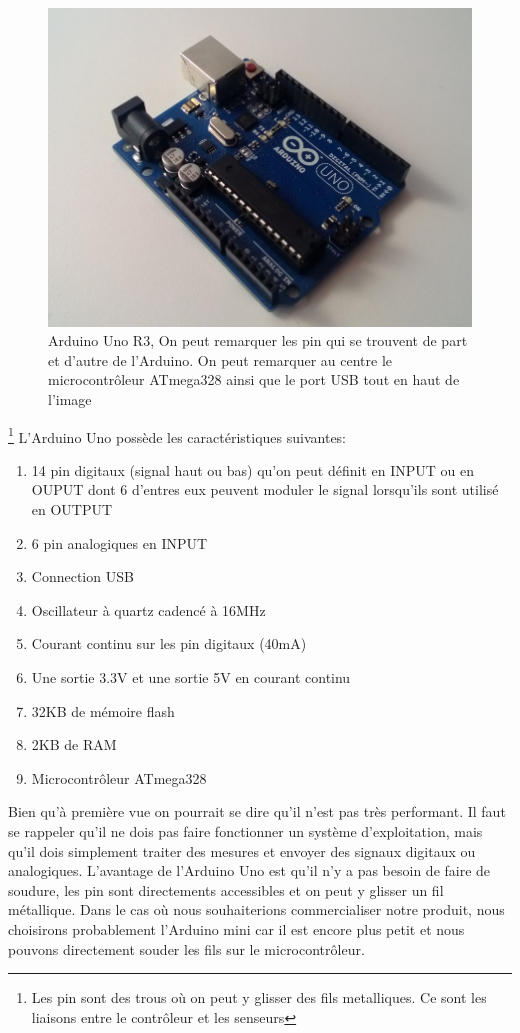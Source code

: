 \documentclass[a4paper,11pt]{report}
\begin{document}
{\begin{figure}[h]
\begin{center}
\includegraphics[scale=0.38]{arduino_uno.jpg}
\caption{Arduino Uno R3\label{fig:ArduinoUnoR3}, On peut remarquer les pin  \label{pin} qui se trouvent de part et d'autre de l'Arduino. On peut remarquer au centre le microcontrôleur ATmega328 ainsi que le port USB tout en haut de l'image}
\end{center}
\end{figure}\footnote{Les pin sont des trous où on peut y glisser des fils metalliques. Ce sont les liaisons entre le contrôleur et les senseurs}
L'Arduino Uno possède les caractéristiques suivantes:
\begin{enumerate}
\item 14 pin digitaux (signal haut ou bas) qu'on peut définit en INPUT ou en OUPUT dont 6 d'entres eux peuvent moduler le signal lorsqu'ils sont utilisé en OUTPUT
\item  6 pin analogiques  en INPUT
\item Connection USB
\item Oscillateur à quartz cadencé à 16MHz
\item Courant continu sur les pin digitaux (40mA)
\item Une sortie 3.3V et une sortie 5V en courant continu
\item 32KB de mémoire flash
\item 2KB de RAM
\item Microcontrôleur ATmega328
\end{enumerate}
Bien qu'à première vue on pourrait se dire qu'il n'est pas très performant. Il faut se rappeler qu'il ne dois pas faire fonctionner un système d'exploitation, mais qu'il dois simplement traiter des mesures et envoyer des signaux digitaux ou analogiques. L'avantage de l'Arduino Uno est qu'il n'y a pas besoin de faire de soudure, les pin sont directements accessibles et on peut y glisser un fil métallique. Dans le cas où nous souhaiterions commercialiser notre produit, nous choisirons probablement l'Arduino mini car il est encore plus petit et nous pouvons directement souder les fils sur le microcontrôleur.

}
\end{document}
